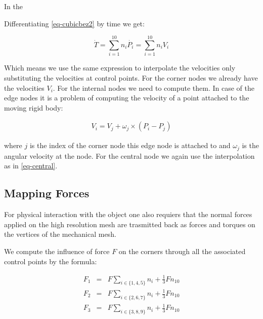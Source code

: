 \documentclass{egpubl}
\begin{document}
In the 

Differentiating \eqref{eq-cubicbez2} by time we get:

\begin{equation}
    \dot{T} = \sum_{i=1}^{10} n_i \dot{P_i} = \sum_{i=1}^{10} n_i V_i
\end{equation}

Which means we use the same expression to interpolate the velocities only
substituting the velocities at control points. For the corner nodes we
already have the velocities $V_i$. For the internal nodes we need to compute
them. In case of the edge nodes it is a problem of computing the velocity
of a point attached to the moving rigid body:

\begin{eqnarray}
    V_i = V_j + \omega_j \times (P_i - P_j)
\end{eqnarray}

where $j$ is the index of the corner node this edge node is attached to and
$\omega_j$ is the angular velocity at the node. For the central node we
again use the interpolation as in \eqref{eq-central}.

\subsection{Mapping Forces}

For physical interaction with the object one also requiers that the normal
forces applied on the high resolution mesh are trasmitted back as forces
and torques on the vertices of the mechanical mesh.

We compute the influence of force $F$ on the corners through all the
associated control points by the formula:

\begin{eqnarray}
    F_1 & = & F \sum_{i \in \{1,4,5\}} n_i + \frac{1}{3} F n_{10} \\
    F_2 & = & F \sum_{i \in \{2,6,7\}} n_i + \frac{1}{3} F n_{10} \\
    F_3 & = & F \sum_{i \in \{3,8,9\}} n_i + \frac{1}{3} F n_{10}
\end{eqnarray}

\end{document}
